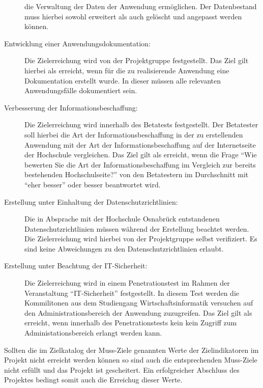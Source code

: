 \begin{description}
	die Verwaltung der Daten der Anwendung ermöglichen. Der Datenbestand muss
	hierbei sowohl erweitert als auch gelöscht und angepasst werden können.
	\item[Entwicklung einer Anwendungsdokumentation:] Die Zielerreichung wird
	von der Projektgruppe festgestellt. Das Ziel gilt hierbei als erreicht, wenn
	für die zu realisierende Anwendung eine Dokumentation erstellt wurde. In dieser
	müssen alle relevanten Anwendungsfälle dokumentiert sein.
	\item[Verbesserung der Informationsbeschaffung:] Die Zielerreichung wird
	innerhalb des Betatests festgestellt. Der Betatester soll hierbei die Art
	der Informationsbeschaffung in der zu erstellenden Anwendung mit der Art
	der Informationsbeschaffung auf der Internetseite der Hochschule
	vergleichen. Das Ziel gilt als erreicht, wenn die Frage "`Wie bewerten Sie die
	Art der Informationsbeschaffung im Vergleich zur bereits bestehenden
	Hochschulseite?"' von den Betatestern im Durchschnitt mit "`eher besser"' oder
	besser beantwortet wird.
	\item[Erstellung unter Einhaltung der Datenschutzrichtlinien:] 
	Die in Absprache mit der Hochschule Osnabrück entstandenen
	Datenschutzrichtlinien müssen während der Erstellung beachtet werden. Die
	Zielerreichung wird hierbei von der Projektgruppe selbst verifiziert. Es sind
	keine Abweichungen zu den Datenschutzrichtlinien erlaubt.
	\item[Erstellung unter Beachtung der IT-Sicherheit:] Die Zielerreichung wird
	in einem Penetrationstest im Rahmen der Veranstaltung "`IT-Sicherheit"'
	festgestellt. In diesem Test werden die Kommilitonen aus dem Studiengang
	Wirtschaftsinformatik versuchen auf den Administrationsbereich der Anwendung
	zuzugreifen. Das Ziel gilt als erreicht, wenn innerhalb des
	Penetrationstests kein kein Zugriff zum Administationsbereich erlangt werden
	kann.
\end{description}


Sollten die im Zielkatalog der Muss-Ziele genannten Werte der Zielindikatoren
im Projekt nicht erreicht werden können so sind auch die entsprechenden
Muss-Ziele nicht erfüllt und das Projekt ist gescheitert. Ein erfolgreicher
Abschluss des Projektes bedingt somit auch die Erreichug dieser Werte.

